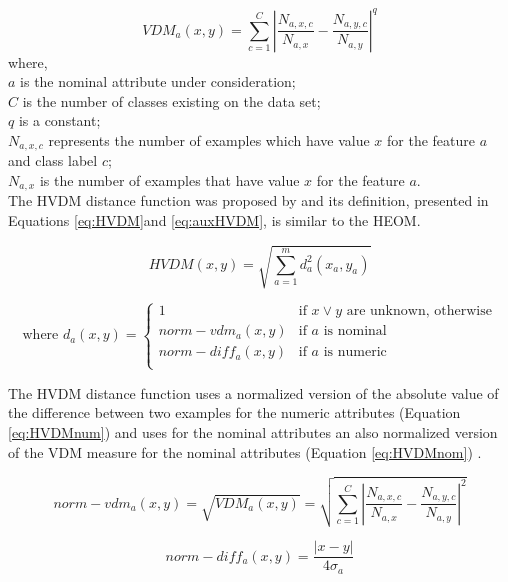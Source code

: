 \documentclass[10pt,a4paper]{article}\usepackage[]{graphicx}\usepackage[]{color}
\begin{document}
\begin{equation}\label{eq:VDM}
VDM_a(x,y)= \sum_{c=1}^{C}  \left\lvert \frac{N_{a,x,c}}{N_{a,x}}-\frac{N_{a,y,c}}{N_{a,y}}\right\rvert ^q
\end{equation}
where, \\
$a$ is the nominal attribute under consideration;\\
$C$ is the number of classes existing on the data set;\\
$q$ is a constant;\\
$N_{a,x,c}$ represents the number of examples which have value $x$ for the feature $a$ and class label $c$;\\
$N_{a,x}$ is the number of examples that have value $x$ for the feature $a$.\\


The HVDM distance function was proposed by \cite{wilson1997improved} and its definition, presented in Equations \ref{eq:HVDM}and \ref{eq:auxHVDM}, is similar to the HEOM.

\begin{equation}\label{eq:HVDM}
HVDM(x,y)= \sqrt{\sum_{a=1}^{m}d_a^2(x_a,y_a) }
\end{equation}

\begin{equation}\label{eq:auxHVDM}
\mbox{where  } d_a(x,y)= \begin{cases} 1 & \mbox{if } x \vee y \mbox{ are unknown, otherwise} \\
norm-vdm_a(x,y) & \mbox{if } a \mbox{ is nominal} \\
norm-diff_a(x,y) & \mbox{if } a \mbox{ is numeric} \\
\end{cases}
\end{equation}

The HVDM distance function uses a normalized version of the absolute value of the difference between two examples for the numeric attributes (Equation \ref{eq:HVDMnum}) and uses for the nominal attributes an also normalized version of the VDM measure for the nominal attributes (Equation \ref{eq:HVDMnom}) .

\begin{equation}\label{eq:HVDMnom}
norm-vdm_a(x,y)=\sqrt{VDM_a(x,y)}=\sqrt{\sum_{c=1}^{C}  \left\lvert \frac{N_{a,x,c}}{N_{a,x}}-\frac{N_{a,y,c}}{N_{a,y}}\right\rvert ^2}
\end{equation}


\begin{equation}\label{eq:HVDMnum}
norm-diff_a(x,y)= \frac{|x-y|}{4\sigma_a}
\end{equation}
\end{document}
